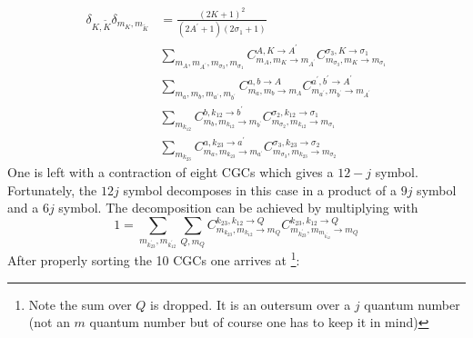 \documentclass[a4paper,10pt,parskip=full]{scrartcl}
\begin{document}
\begin{equation}
  \begin{split}
  \delta_{K,\tilde{K}}\delta_{m_K,m_{\tilde{K}}}&=
  \frac{(2K+1)^2}{(2A^\prime+1)(2\sigma_1+1)}\\
  &\sum_{m_{A},m_{A^\prime},m_{\sigma_3},m_{\sigma_1}}C^{A,K\rightarrow
    A^\prime}_{m_A,m_{K}\rightarrow m_{A^\prime}}C^{\sigma_3,K\rightarrow\sigma_1}_{m_{\sigma_3},m_{K}\rightarrow
    m_{\sigma_1}}\\
  &\sum_{m_{a},m_{b},m_{a^\prime},m_{b^\prime}} C^{a,b\rightarrow A}_{{m_a,m_{b}}\rightarrow m_{A}}C^{a^\prime,b^\prime\rightarrow A^\prime}_{m_{a^\prime},m_{b^\prime}\rightarrow m_{A^\prime}}\\
  &\sum_{m_{k_{12}}}C^{b,k_{12}\rightarrow
    b^\prime}_{m_b,m_{k_{12}}\rightarrow
    m_{b^\prime}}C^{\sigma_2,k_{12}\rightarrow
    \sigma_1}_{m_{\sigma_2},m_{k_{12}}\rightarrow m_{\sigma_1}}\\
  &\sum_{m_{k_{23}}}C^{a,k_{23}\rightarrow a^\prime}_{m_a,m_{k_{23}}\rightarrow m_{a^\prime}}C^{\sigma_3,k_{23}\rightarrow \sigma_2}_{m_{\sigma_3},m_{k_{23}}\rightarrow m_{\sigma_2}}
  \end{split}
\end{equation}
One is left with a contraction of eight CGCs which gives a $12-j$
symbol. Fortunately, the $12j$ symbol decomposes in this case in a
product of a $9j$ symbol and a $6j$ symbol. The decomposition can be
achieved by multiplying with
\begin{equation}
1=\sum_{m_{k_{23}^\prime},m_{k_{12}^\prime}}\sum_{Q,m_{Q}}C^{k_{23},k_{12}\rightarrow Q}_{m_{k_{23}},m_{k_{12}}\rightarrow m_{Q}}C^{k_{23},k_{12}\rightarrow Q}_{m_{k_{23}^\prime},m_{m_{k_{12}^\prime}}\rightarrow m_{Q}}
\end{equation}
After properly sorting the 10 CGCs  one arrives at \footnote{Note the sum over
$Q$ is dropped. It is an outersum over a $j$ quantum number (not an
$m$ quantum number but of course one has to keep it in mind)}:
\end{document}

